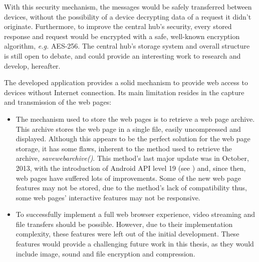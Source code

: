 \begin{itemize}
	With this security mechanism, the messages would be safely transferred between devices, without the possibility of a device decrypting data of a request it didn't originate. Furthermore, to improve the central hub's security, every stored response and request would be encrypted with a safe, well-known encryption algorithm, \textit{e.g.} \gls{AES}-256. The central hub's storage system and overall structure is still open to debate, and could provide an interesting work to research and develop, hereafter.
	
\end{itemize}

The developed application provides a solid mechanism to provide web access to devices without Internet connection. Its main limitation resides in the capture and transmission of the web pages:

\begin{itemize}
	
	\item The mechanism used to store the web pages is to retrieve a web page archive. This archive stores the web page in a single file, easily uncompressed and displayed. Although this appears to be the perfect solution for the web page storage, it has some flaws, inherent to the method used to retrieve the archive, \textit{savewebarchive()}. This method's last major update was in October, 2013, with the introduction of Android API level 19 (see \cite{kitkat}) and, since then, web pages have suffered lots of improvements. Some of the new web page features may not be stored, due to the method's lack of compatibility thus, some web pages' interactive features may not be responsive.
	
	\item To successfully implement a full web browser experience, video streaming and file transfers should be possible. However, due to their implementation complexity, these features were left out of the initial development. These features would provide a challenging future work in this thesis, as they would include image, sound and file encryption and compression.
	
\end{itemize}

